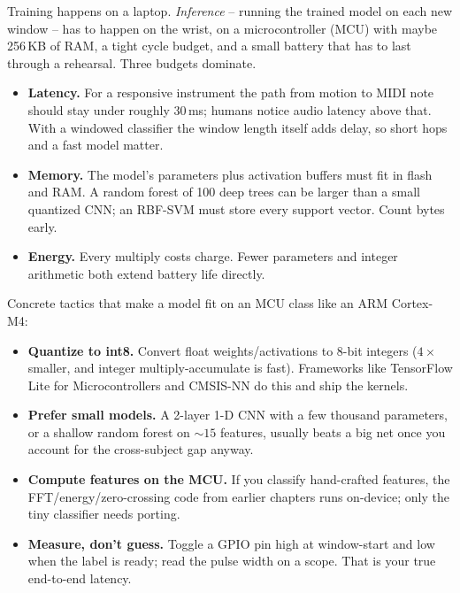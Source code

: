 Training happens on a laptop. \emph{Inference} -- running the trained model on each new
window -- has to happen on the wrist, on a microcontroller (MCU) with maybe 256\,KB of
RAM, a tight cycle budget, and a small battery that has to last through a rehearsal. Three
budgets dominate.

\begin{itemize}
  \item \textbf{Latency.} For a responsive instrument the path from motion to MIDI note
        should stay under roughly $30$\,ms; humans notice audio latency above that. With
        a windowed classifier the window length itself adds delay, so short hops and a
        fast model matter.
  \item \textbf{Memory.} The model's parameters plus activation buffers must fit in
        flash and RAM. A random forest of 100 deep trees can be larger than a small
        quantized CNN; an RBF-SVM must store every support vector. Count bytes early.
  \item \textbf{Energy.} Every multiply costs charge. Fewer parameters and integer
        arithmetic both extend battery life directly.
\end{itemize}

\begin{buildbox}
Concrete tactics that make a model fit on an MCU class like an ARM Cortex-M4:
\begin{itemize}
  \item \textbf{Quantize to int8.} Convert float weights/activations to 8-bit integers
        ($4\times$ smaller, and integer multiply-accumulate is fast). Frameworks like
        TensorFlow Lite for Microcontrollers and CMSIS-NN do this and ship the kernels.
  \item \textbf{Prefer small models.} A 2-layer 1-D CNN with a few thousand parameters,
        or a shallow random forest on $\sim\!15$ features, usually beats a big net once
        you account for the cross-subject gap anyway.
  \item \textbf{Compute features on the MCU.} If you classify hand-crafted features, the
        FFT/energy/zero-crossing code from earlier chapters runs on-device; only the tiny
        classifier needs porting.
  \item \textbf{Measure, don't guess.} Toggle a GPIO pin high at window-start and low
        when the label is ready; read the pulse width on a scope. That is your true
        end-to-end latency.
\end{itemize}
\end{buildbox}

